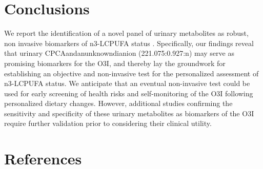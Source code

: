 \documentclass[journal=jacsat,manuscript=article]{achemso}
\begin{document}
\section{Conclusions}\label{conclusions}

We report the identification of a novel panel of urinary metabolites as
robust, non invasive biomarkers of n3-LCPUFA status . Specifically, our
findings reveal that urinary CPCAandanunknowndianion (221.075:0.927:n)
may serve as promising biomarkers for the O3I, and thereby lay the
groundwork for establishing an objective and non-invasive test for the
personalized assessment of n3-LCPUFA status. We anticipate that an
eventual non-invasive test could be used for early screening of health
risks and self-monitoring of the O3I following personalized dietary
changes. However, additional studies confirming the sensitivity and
specificity of these urinary metabolites as biomarkers of the O3I
require further validation prior to considering their clinical utility.

\section*{References}\label{references}
\end{document}
